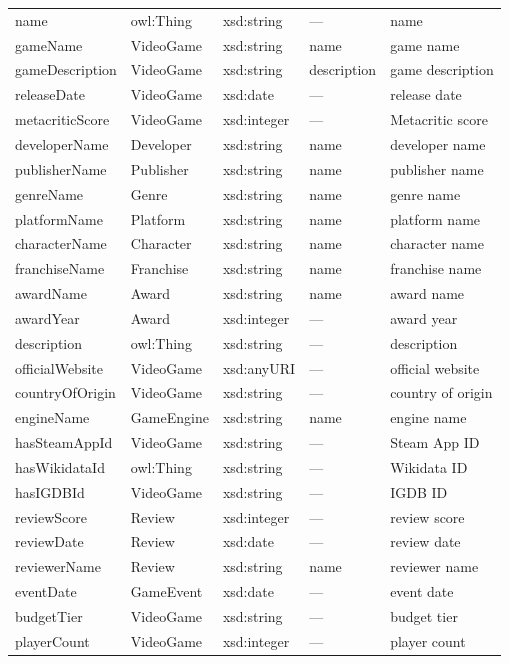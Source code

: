\begin{longtable}{lllll}
name              & owl:Thing   & xsd:string  & ---         & name \\
gameName          & VideoGame   & xsd:string  & name        & game name \\
gameDescription   & VideoGame   & xsd:string  & description & game description \\
releaseDate       & VideoGame   & xsd:date    & ---         & release date \\
metacriticScore   & VideoGame   & xsd:integer & ---         & Metacritic score \\
developerName     & Developer   & xsd:string  & name        & developer name \\
publisherName     & Publisher   & xsd:string  & name        & publisher name \\
genreName         & Genre       & xsd:string  & name        & genre name \\
platformName      & Platform    & xsd:string  & name        & platform name \\
characterName     & Character   & xsd:string  & name        & character name \\
franchiseName     & Franchise   & xsd:string  & name        & franchise name \\
awardName         & Award       & xsd:string  & name        & award name \\
awardYear         & Award       & xsd:integer & ---         & award year \\
description       & owl:Thing   & xsd:string  & ---         & description \\
officialWebsite   & VideoGame   & xsd:anyURI  & ---         & official website \\
countryOfOrigin   & VideoGame   & xsd:string  & ---         & country of origin \\
engineName        & GameEngine  & xsd:string  & name        & engine name \\
hasSteamAppId     & VideoGame   & xsd:string  & ---         & Steam App ID \\
hasWikidataId     & owl:Thing   & xsd:string  & ---         & Wikidata ID \\
hasIGDBId         & VideoGame   & xsd:string  & ---         & IGDB ID \\
reviewScore       & Review      & xsd:integer & ---         & review score \\
reviewDate        & Review      & xsd:date    & ---         & review date \\
reviewerName      & Review      & xsd:string  & name        & reviewer name \\
eventDate         & GameEvent   & xsd:date    & ---         & event date \\
budgetTier        & VideoGame   & xsd:string  & ---         & budget tier \\
playerCount       & VideoGame   & xsd:integer & ---         & player count \\
\bottomrule
\end{longtable}

